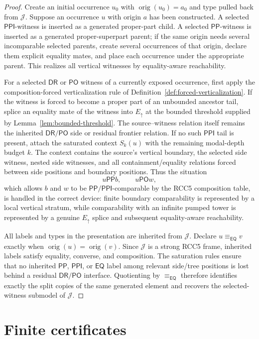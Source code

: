 \documentclass[11pt]{article}
\newcommand{\EQ}{\mathsf{EQ}}
\newcommand{\DR}{\mathsf{DR}}
\newcommand{\PO}{\mathsf{PO}}
\newcommand{\PP}{\mathsf{PP}}
\newcommand{\PPI}{\mathsf{PPI}}
\newcommand{\J}{\mathcal J}
\newcommand{\orig}{\operatorname{orig}}
\newcommand{\eqc}{\equiv_{\EQ}}
\begin{document}
\begin{proof}
Create an initial occurrence $u_0$ with $\orig(u_0)=a_0$ and type pulled back from $\J$.  Suppose an occurrence $u$ with origin $a$ has been constructed.  A selected $\PPI$-witness is inserted as a generated proper-part child.  A selected $\PP$-witness is inserted as a generated proper-superpart parent; if the same origin needs several incomparable selected parents, create several occurrences of that origin, declare them explicit equality mates, and place each occurrence under the appropriate parent.  This realizes all vertical witnesses by equality-aware reachability.

For a selected $\DR$ or $\PO$ witness of a currently exposed occurrence, first apply the composition-forced verticalization rule of Definition~\ref{def:forced-verticalization}.  If the witness is forced to become a proper part of an unbounded ancestor tail, splice an equality mate of the witness into $E_{\uparrow}$ at the bounded threshold supplied by Lemma~\ref{lem:bounded-threshold}.  The source--witness relation itself remains the inherited $\DR/\PO$ side or residual frontier relation.  If no such $\PPI$ tail is present, attach the saturated context $S_k(u)$ with the remaining modal-depth budget $k$.  The context contains the source's vertical boundary, the selected side witness, nested side witnesses, and all containment/equality relations forced between side positions and boundary positions.  Thus the situation
\[
   u\PP b,
   \qquad
   u\PO w,
\]
which allows $b$ and $w$ to be $\PP/\PPI$-comparable by the RCC5 composition table, is handled in the correct device: finite boundary comparability is represented by a local vertical stratum, while comparability with an infinite pumped tower is represented by a genuine $E_{\uparrow}$ splice and subsequent equality-aware reachability.

All labels and types in the presentation are inherited from $\J$.  Declare $u\eqc v$ exactly when $\orig(u)=\orig(v)$.  Since $\J$ is a strong RCC5 frame, inherited labels satisfy equality, converse, and composition.  The saturation rules ensure that no inherited $\PP$, $\PPI$, or $\EQ$ label among relevant side/tree positions is lost behind a residual $\DR/\PO$ interface.  Quotienting by $\eqc$ therefore identifies exactly the split copies of the same generated element and recovers the selected-witness submodel of $\J$.
\end{proof}


\section{Finite certificates}
\end{document}
